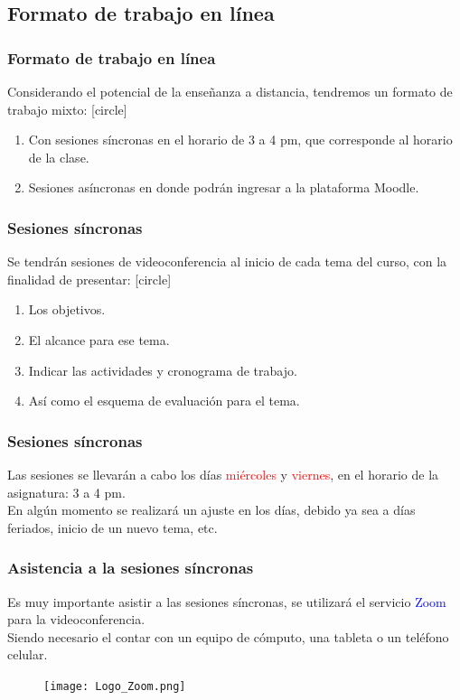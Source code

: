 \subsection{Formato de trabajo en línea}
\begin{frame}
\frametitle{Formato de trabajo en línea}
Considerando el potencial de la enseñanza a distancia, tendremos un formato de trabajo mixto:
[circle]
\begin{enumerate}[<+->]
\item Con sesiones síncronas en el horario de 3 a 4 pm, que corresponde al horario de la clase.
\item Sesiones asíncronas en donde podrán ingresar a la plataforma Moodle.
\end{enumerate}
\end{frame}
\begin{frame}
\frametitle{Sesiones síncronas}
Se tendrán sesiones de videoconferencia al inicio de cada tema del curso, con la finalidad de presentar:
[circle]
\begin{enumerate}[<+->]
\item Los objetivos.
\item El alcance para ese tema.
\item Indicar las actividades y cronograma de trabajo.
\item Así como el esquema de evaluación para el tema.
\end{enumerate}
\end{frame}
\begin{frame}
\frametitle{Sesiones síncronas}
Las sesiones se llevarán a cabo los días \textcolor{red}{miércoles} y \textcolor{red}{viernes}, en el horario de la asignatura: 3 a 4 pm.
\\
\bigskip
\pause
En algún momento se realizará un ajuste en los días, debido ya sea a días feriados, inicio de un nuevo tema, etc.
\end{frame}
\begin{frame}
\frametitle{Asistencia a la sesiones síncronas}
Es muy importante asistir a las sesiones síncronas, se utilizará el servicio \textcolor{blue}{Zoom} para la videoconferencia.
\\
\bigskip
\pause
Siendo necesario el contar con un equipo de cómputo, una tableta o un teléfono celular.
\begin{figure}
    \centering
    \texttt{[image: Logo\_Zoom.png]}
\end{figure}
\end{frame}
